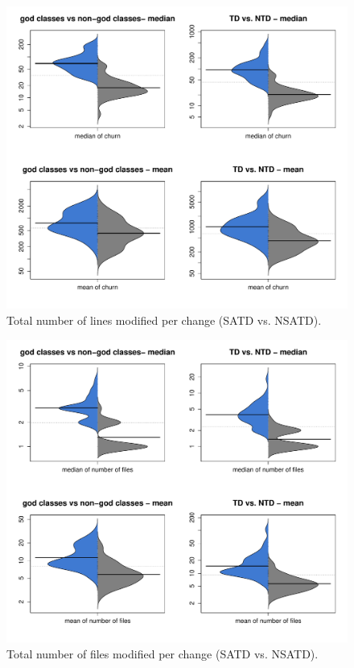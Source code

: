 \begin{figure}[tb!]
	\centering
	\includegraphics[width=120mm]{figures/chapter4/rq3_distribution_of_churn}
	\caption{Total number of lines modified per change (SATD vs. NSATD).}
	\label{figure:tlcpc}
\end{figure}



\begin{figure}[tb!]
	\centering
	\includegraphics[width=120mm]{figures/chapter4/rq3_distribution_of_nf}
	\caption{Total number of files modified per change (SATD vs. NSATD).}
	\label{figure:tfcpc}
\end{figure}

